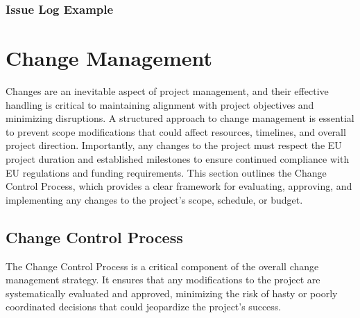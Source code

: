 \documentclass[a4paper,12pt]{article}
\begin{document}
\subsubsection*{Issue Log Example} 

\begin{table}[h!]
    \centering 
    \label{tab:issue_log} 
\end{table}



\newpage

\section{\textcolor{EUblue}{Change Management}} \label{sec:change_management}

Changes are an inevitable aspect of project management, and their effective handling is critical to maintaining alignment with project objectives and minimizing disruptions. A structured approach to change management is essential to prevent scope modifications that could affect resources, timelines, and overall project direction. Importantly, any changes to the project must respect the EU project duration and established milestones to ensure continued compliance with EU regulations and funding requirements. This section outlines the Change Control Process, which provides a clear framework for evaluating, approving, and implementing any changes to the project’s scope, schedule, or budget.

\subsection{\textcolor{EUblue}{Change Control Process}}

The Change Control Process is a critical component of the overall change management strategy. It ensures that any modifications to the project are systematically evaluated and approved, minimizing the risk of hasty or poorly coordinated decisions that could jeopardize the project's success.
\end{document}
